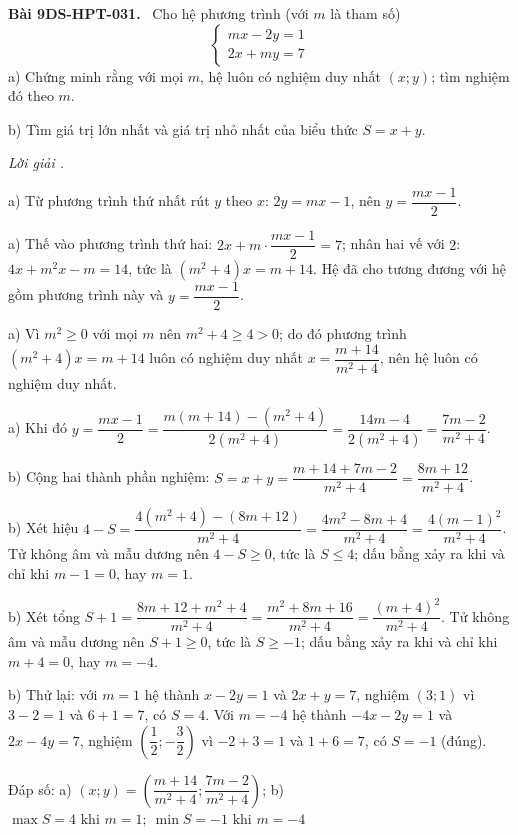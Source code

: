 \documentclass[12pt,a4paper]{article}
\newenvironment{problem}[1][]{\par\medskip\noindent\textbf{Bài #1.}\ }{\par}
\newenvironment{solution}[1][]{\par\noindent\textit{Lời giải #1.}\par}{\par}
\begin{document}
\begin{problem}[9DS-HPT-031]
Cho hệ phương trình (với $m$ là tham số)
\[ \begin{cases} mx - 2y = 1 \\ 2x + my = 7 \end{cases} \]
a) Chứng minh rằng với mọi $m$, hệ luôn có nghiệm duy nhất $(x; y)$; tìm nghiệm đó theo $m$.

b) Tìm giá trị lớn nhất và giá trị nhỏ nhất của biểu thức $S = x + y$.

\begin{solution}
a) Từ phương trình thứ nhất rút $y$ theo $x$: $2y = mx - 1$, nên $y = \dfrac{mx - 1}{2}$.

a) Thế vào phương trình thứ hai: $2x + m \cdot \dfrac{mx - 1}{2} = 7$; nhân hai vế với $2$: $4x + m^2x - m = 14$, tức là $(m^2 + 4)x = m + 14$. Hệ đã cho tương đương với hệ gồm phương trình này và $y = \dfrac{mx - 1}{2}$.

a) Vì $m^2 \geq 0$ với mọi $m$ nên $m^2 + 4 \geq 4 > 0$; do đó phương trình $(m^2 + 4)x = m + 14$ luôn có nghiệm duy nhất $x = \dfrac{m + 14}{m^2 + 4}$, nên hệ luôn có nghiệm duy nhất.

a) Khi đó $y = \dfrac{mx - 1}{2} = \dfrac{m(m + 14) - (m^2 + 4)}{2(m^2 + 4)} = \dfrac{14m - 4}{2(m^2 + 4)} = \dfrac{7m - 2}{m^2 + 4}$.

b) Cộng hai thành phần nghiệm: $S = x + y = \dfrac{m + 14 + 7m - 2}{m^2 + 4} = \dfrac{8m + 12}{m^2 + 4}$.

b) Xét hiệu $4 - S = \dfrac{4(m^2 + 4) - (8m + 12)}{m^2 + 4} = \dfrac{4m^2 - 8m + 4}{m^2 + 4} = \dfrac{4(m - 1)^2}{m^2 + 4}$. Tử không âm và mẫu dương nên $4 - S \geq 0$, tức là $S \leq 4$; dấu bằng xảy ra khi và chỉ khi $m - 1 = 0$, hay $m = 1$.

b) Xét tổng $S + 1 = \dfrac{8m + 12 + m^2 + 4}{m^2 + 4} = \dfrac{m^2 + 8m + 16}{m^2 + 4} = \dfrac{(m + 4)^2}{m^2 + 4}$. Tử không âm và mẫu dương nên $S + 1 \geq 0$, tức là $S \geq -1$; dấu bằng xảy ra khi và chỉ khi $m + 4 = 0$, hay $m = -4$.

b) Thử lại: với $m = 1$ hệ thành $x - 2y = 1$ và $2x + y = 7$, nghiệm $(3; 1)$ vì $3 - 2 = 1$ và $6 + 1 = 7$, có $S = 4$. Với $m = -4$ hệ thành $-4x - 2y = 1$ và $2x - 4y = 7$, nghiệm $\left(\dfrac{1}{2}; -\dfrac{3}{2}\right)$ vì $-2 + 3 = 1$ và $1 + 6 = 7$, có $S = -1$ (đúng).

Đáp số: a) $\boxed{(x; y) = \left(\dfrac{m + 14}{m^2 + 4}; \dfrac{7m - 2}{m^2 + 4}\right)}$; b) $\boxed{\max S = 4 \text{ khi } m = 1;\ \min S = -1 \text{ khi } m = -4}$
\end{solution}
\end{problem}
\end{document}
